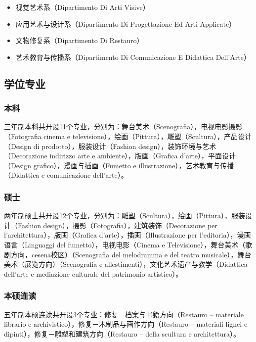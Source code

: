 \documentclass[3pt,a5paper,openright,twoside]{book}
\begin{document}
\begin{itemize}
\item 视觉艺术系（Dipartimento Di Arti Visive）
\item 应用艺术与设计系（Dipartimento Di Progettazione Ed Arti Applicate）
\item 文物修复系（Dipartimento Di Restauro）
\item 艺术教育与传播系（Dipartimento Di Comunicazione E Didattica Dell’Arte）
\end{itemize}

\subsection{学位专业}

\subsubsection{本科}
三年制本科共开设11个专业，分别为：舞台美术（Scenografia），电视电影摄影（Fotografia cinema e televisione），绘画（Pittura），雕塑（Scultura），产品设计（Design di prodotto），服装设计（Fashion design），装饰环境与艺术（Decorazione indirizzo arte e ambiente），版画（Grafica d’arte），平面设计（Design grafico），漫画与插画（Fumetto e illustrazione），艺术教育与传播（Didattica e comunicazione dell’arte）。
      
\subsubsection{硕士}
两年制硕士共开设12个专业，分别为：雕塑（Scultura），绘画（Pittura），服装设计（Fashion design），摄影（Fotografia），建筑装饰（Decorazione per l’architettura），版画（Grafica d’arte），插画（Illustrazione per l’editoria），漫画语言（Linguaggi del fumetto），电视电影（Cinema e Televisione），舞台美术（歌剧方向，cesena校区）（Scenografia del melodramma e del teatro musicale），舞台美术（展览方向）（Scenografia e allestimenti），文化艺术遗产与教学（Didattica dell’arte e mediazione culturale del patrimonio artistico）。

\subsubsection{本硕连读}
五年制本硕连读共开设3个专业：修复－档案与书籍方向（Restauro – materiale librario e archivistico），修复－木制品与画作方向（Restauro – materiali lignei e dipinti），修复－雕塑和建筑方向（Restauro – della scultura e architettura）。
\end{document}
